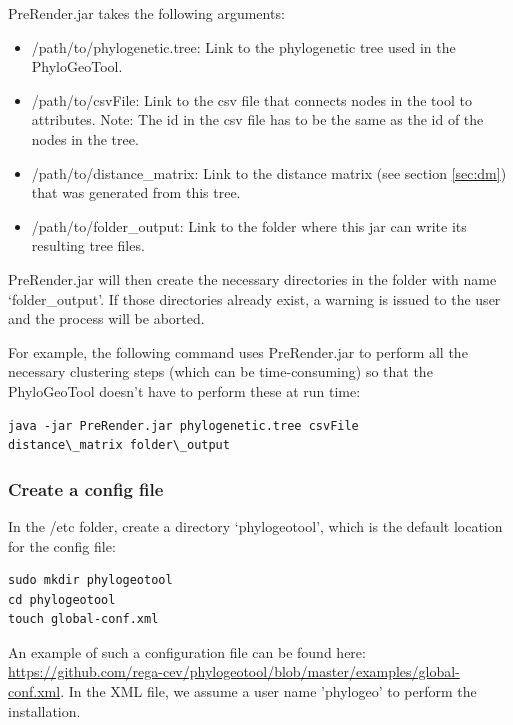\documentclass[a4paper, 11pt]{article} %
\begin{document}
PreRender.jar takes the following arguments: 
\begin{itemize}
\item /path/to/phylogenetic.tree: Link to the phylogenetic tree used in the PhyloGeoTool.
\item /path/to/csvFile: Link to the csv file that connects nodes in the tool to attributes. Note: The id in the csv file has to be the same as the id of the nodes in the tree.
\item /path/to/distance\_matrix: Link to the distance matrix (see section \ref{sec:dm}) that was generated from this tree.
\item /path/to/folder\_output: Link to the folder where this jar can write its resulting tree files.
\end{itemize}
PreRender.jar will then create the necessary directories in the folder with name `folder\_output'.
If those directories already exist, a warning is issued to the user and the process will be aborted.

For example, the following command uses PreRender.jar to perform all the necessary clustering steps (which can be time-consuming) so that the PhyloGeoTool doesn't have to perform these at run time: 
\begin{verbatim}
java -jar PreRender.jar phylogenetic.tree csvFile 
distance\_matrix folder\_output
\end{verbatim}


\subsubsection{Create a config file}

In the /etc folder, create a directory `phylogeotool', which is the default location for the config file:
\begin{verbatim}
sudo mkdir phylogeotool
cd phylogeotool
touch global-conf.xml
\end{verbatim}

An example of such a configuration file can be found here: \url{https://github.com/rega-cev/phylogeotool/blob/master/examples/global-conf.xml}.
In the XML file, we assume a user name 'phylogeo' to perform the installation.
\end{document}
